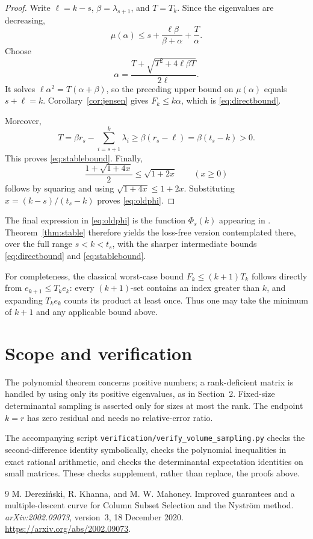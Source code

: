 \documentclass[11pt]{article}
\begin{document}
\begin{proof}
Write $\ell=k-s$, $\beta=\lambda_{s+1}$, and $T=T_k$. Since the eigenvalues are decreasing,
\[
 \mu(\alpha)\le s+\frac{\ell\beta}{\beta+\alpha}+\frac{T}{\alpha}.
\]
Choose
\[
 \alpha=\frac{T+\sqrt{T^2+4\ell\beta T}}{2\ell}.
\]
It solves $\ell\alpha^2=T(\alpha+\beta)$, so the preceding upper bound on $\mu(\alpha)$ equals $s+\ell=k$. Corollary~\ref{cor:jensen} gives $F_k\le k\alpha$, which is \eqref{eq:directbound}.

Moreover,
\[
 T=\beta r_s-\sum_{i=s+1}^k\lambda_i
       \ge\beta(r_s-\ell)=\beta(t_s-k)>0.
\]
This proves \eqref{eq:stablebound}. Finally,
\[
 \frac{1+\sqrt{1+4x}}2\le\sqrt{1+2x}\qquad(x\ge0)
\]
follows by squaring and using $\sqrt{1+4x}\le1+2x$. Substituting $x=(k-s)/(t_s-k)$ proves \eqref{eq:oldphi}.
\end{proof}

The final expression in \eqref{eq:oldphi} is the function $\Phi_s(k)$ appearing in \cite[Theorem~1]{DKM2020}. Theorem~\ref{thm:stable} therefore yields the loss-free version contemplated there, over the full range $s<k<t_s$, with the sharper intermediate bounds \eqref{eq:directbound} and \eqref{eq:stablebound}.

For completeness, the classical worst-case bound $F_k\le(k+1)T_k$ follows directly from $e_{k+1}\le T_ke_k$: every $(k+1)$-set contains an index greater than $k$, and expanding $T_ke_k$ counts its product at least once. Thus one may take the minimum of $k+1$ and any applicable bound above.

\section{Scope and verification}
The polynomial theorem concerns positive numbers; a rank-deficient matrix is handled by using only its positive eigenvalues, as in Section~2. Fixed-size determinantal sampling is asserted only for sizes at most the rank. The endpoint $k=r$ has zero residual and needs no relative-error ratio.

The accompanying script \texttt{verification/verify\_volume\_sampling.py} checks the second-difference identity symbolically, checks the polynomial inequalities in exact rational arithmetic, and checks the determinantal expectation identities on small matrices. These checks supplement, rather than replace, the proofs above.

\begin{thebibliography}{9}
M. Derezi\'nski, R. Khanna, and M. W. Mahoney.
\newblock Improved guarantees and a multiple-descent curve for Column Subset Selection and the Nystr\"om method.
\newblock \emph{arXiv:2002.09073}, version~3, 18 December 2020.
\newblock \url{https://arxiv.org/abs/2002.09073}.
\end{thebibliography}
\end{document}
